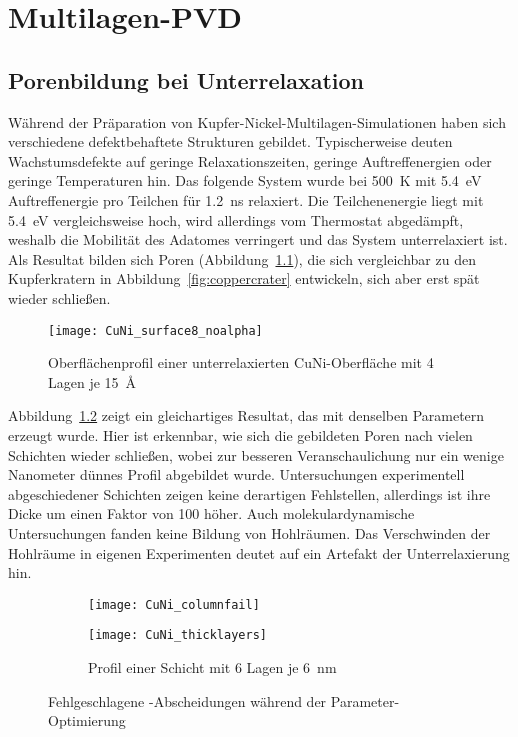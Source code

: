 \chapter{Multilagen-PVD}
\label{appendix_multilayer}

\section{Porenbildung bei Unterrelaxation}

Während der Präparation von Kupfer-Nickel-Multilagen-Simulationen haben sich verschiedene defektbehaftete Strukturen gebildet.
Typischerweise deuten Wachstumsdefekte auf geringe Relaxationszeiten, geringe Auftreffenergien oder geringe Temperaturen hin.
Das folgende System wurde bei \SI{500}{\kelvin} mit \SI{5.4}{\electronvolt} Auftreffenergie pro Teilchen für \SI{1.2}{\nano\second} relaxiert.
Die Teilchenenergie liegt mit \SI{5.4}{\electronvolt} vergleichsweise hoch\cite{zhou_atomistic_1998}, wird allerdings vom Thermostat abgedämpft, weshalb die Mobilität des Adatomes verringert und das System unterrelaxiert ist.
Als Resultat bilden sich Poren (Abbildung~\ref{fig:multilayer_surfacefail}), die sich vergleichbar zu den Kupferkratern in Abbildung~\ref{fig:coppercrater} entwickeln, sich aber erst spät wieder schließen.

\begin{figure}[!h]
  \centering
  \texttt{[image: CuNi\_surface8\_noalpha]}
  \caption{Oberflächenprofil einer unterrelaxierten CuNi-Oberfläche mit 4 Lagen je \SI{15}{\angstrom}}
  \label{fig:multilayer_surfacefail}
\end{figure}

Abbildung~\ref{fig:multilayer_columnfail} zeigt ein gleichartiges Resultat, das mit denselben Parametern erzeugt wurde.
Hier ist erkennbar, wie sich die gebildeten Poren nach vielen Schichten wieder schließen, wobei zur besseren Veranschaulichung nur ein wenige Nanometer dünnes Profil abgebildet wurde.
Untersuchungen experimentell abgeschiedener Schichten zeigen keine derartigen Fehlstellen\cite{yang_pulsed_1995}, allerdings ist ihre Dicke um einen Faktor von \num{100} höher.
Auch molekulardynamische Untersuchungen\cite{zhou_atomic_2001} fanden keine Bildung von Hohlräumen.
Das Verschwinden der Hohlräume in eigenen Experimenten deutet auf ein Artefakt der Unterrelaxierung hin.

\begin{figure}[!ht]
  \captionsetup[subfigure]{singlelinecheck=false}
  \def\subfigwidth{7cm}
  \begin{subfigure}[t]{\subfigwidth}
    \texttt{[image: CuNi\_columnfail]}
    \label{fig:multilayer_columnfail}
  \end{subfigure}
  \hfill
  \begin{subfigure}[t]{\subfigwidth}
    \texttt{[image: CuNi\_thicklayers]}
    \caption{Profil einer Schicht mit 6 Lagen je \SI{6}{\nano\meter}}
    \label{fig:multilayer_thickfail}
  \end{subfigure}
  \caption{Fehlgeschlagene -Abscheidungen während der Parameter-Optimierung}
\end{figure}

